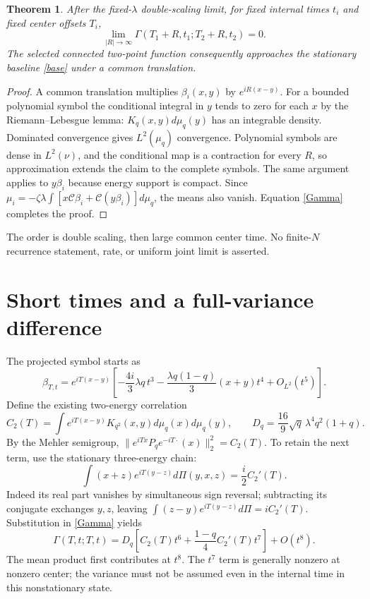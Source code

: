 \documentclass[11pt]{article}
\newtheorem{theorem}{Theorem}
\begin{document}
\begin{theorem}\label{late}
After the fixed-$\lambda$ double-scaling limit, for fixed internal
times $t_i$ and fixed center offsets $T_i$,
\begin{equation}
 \lim_{|R|\to\infty}\Gamma(T_1+R,t_1;T_2+R,t_2)=0.
\end{equation}
The selected connected two-point function consequently approaches
the stationary baseline \eqref{base} under a common translation.
\end{theorem}
\begin{proof}
A common translation multiplies $\beta_i(x,y)$ by
$e^{iR(x-y)}$. For a bounded polynomial symbol the conditional
integral in $y$ tends to zero for each $x$ by the
Riemann--Lebesgue lemma: $K_q(x,y)d\mu_q(y)$ has an integrable
density. Dominated convergence gives $L^2(\mu_q)$ convergence.
Polynomial symbols are dense in $L^2(\nu)$, and the conditional
map is a contraction for every $R$, so approximation extends the
claim to the complete symbols. The same argument applies to
$y\beta_i$ because energy support is compact. Since
$\mu_i=-\zeta\lambda\int[x\mathcal C\beta_i+
\mathcal C(y\beta_i)]d\mu_q$, the means also vanish. Equation
\eqref{Gamma} completes the proof.
\end{proof}
The order is double scaling, then large common center time.
No finite-$N$ recurrence statement, rate, or uniform joint limit
is asserted.

\newpage
\section{Short times and a full-variance difference}
The projected symbol starts as
\begin{equation}\label{shortbeta}
 \beta_{T,t}=e^{iT(x-y)}\left[
 -\frac{4i}{3}\lambda q\,t^3
 -\frac{\lambda q(1-q)}3(x+y)t^4+O_{L^2}(t^5)\right].
\end{equation}
Define the existing two-energy correlation
\[
 C_2(T)=\int e^{iT(x-y)}K_{q^2}(x,y)d\mu_q(x)d\mu_q(y),
 \qquad D_q=\frac{16}{9}\sqrt q\,\lambda^4q^2(1+q).
\]
By the Mehler semigroup,
$\|e^{iTx}P_q e^{-iT\cdot}(x)\|_2^2=C_2(T)$.
To retain the next term, use the stationary three-energy chain:
\[
 \int(x+z)e^{iT(y-z)}d\Pi(y,x,z)=\frac{i}{2}C_2'(T).
\]
Indeed its real part vanishes by simultaneous sign reversal;
subtracting its conjugate exchanges $y,z$, leaving
$\int(z-y)e^{iT(y-z)}d\Pi=iC_2'(T)$.
Substitution in \eqref{Gamma} yields
\begin{equation}\label{shortG}
 \Gamma(T,t;T,t)=D_q\left[C_2(T)t^6+
                 \frac{1-q}{4}C_2'(T)t^7\right]+O(t^8).
\end{equation}
The mean product first contributes at $t^8$. The $t^7$ term is
generally nonzero at nonzero center; the variance must not be
assumed even in the internal time in this nonstationary state.
\end{document}
